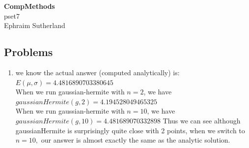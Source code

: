 \documentclass[12pt]{article}
\begin{document}
\begin{center}
{\large \bf CompMethods }   \\ \large pset7 \\ Ephraim Sutherland
\end{center}

\subsection*{Problems}

\begin{enumerate}

	\item we know the actual answer (computed analytically) is: $E(\mu, \sigma) = 4.4816890703380645$
		\\When we run gaussian-hermite with  $n=2$, we have $gaussianHermite(g, 2) = 4.194528049465325$
		\\When we run gaussian-hermite with  $n=10$, we have $gaussianHermite(g, 10) = 4.481689070332898$
		Thus we can see although gaussianHermite is surprisingly quite close with 2 points, when we switch to $n=10,$ our answer is almost exactly the same as the analytic solution.


\end{enumerate}
\end{document}
